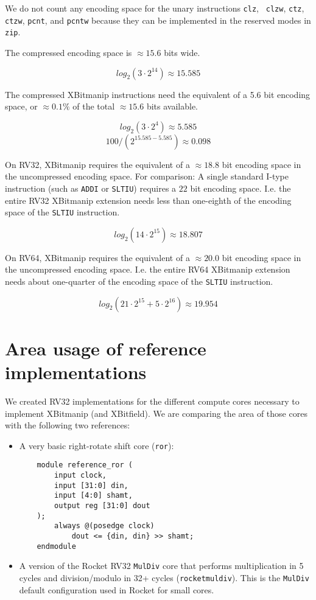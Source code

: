 We do not count any encoding space for the unary instructions {\tt clz}, {\tt
clzw}, {\tt ctz}, {\tt ctzw}, {\tt pcnt}, and {\tt pcntw} because they can
be implemented in the reserved modes in {\tt zip}.

The compressed encoding space is $\approx 15.6$ bits wide.

$$ log_2(3 \cdot 2^{14}) \approx 15.585 $$

The compressed XBitmanip instructions need the equivalent of a 5.6 bit
encoding space, or $\approx 0.1\%$ of the total $\approx 15.6$ bits available.

$$ log_2(3 \cdot 2^4) \approx 5.585 $$
$$ 100 / (2^{15.585-5.585}) \approx 0.098 $$

On RV32, XBitmanip requires the equivalent of a $\approx 18.8$ bit encoding space in
the uncompressed encoding space. For comparison: A single standard I-type
instruction (such as \texttt{ADDI} or \texttt{SLTIU}) requires a $22$ bit
encoding space. I.e. the entire RV32 XBitmanip extension needs less than
one-eighth of the encoding space of the \texttt{SLTIU} instruction.

$$ log_2(14\cdot2^{15}) \approx 18.807 $$

On RV64, XBitmanip requires the equivalent of a $\approx 20.0$ bit encoding
space in the uncompressed encoding space. I.e. the entire RV64 XBitmanip
extension needs about one-quarter of the encoding space of the \texttt{SLTIU}
instruction.

$$ log_2(21\cdot2^{15} + 5\cdot2^{16}) \approx 19.954 $$

\section{Area usage of reference implementations}

We created RV32 implementations for the different compute cores necessary to
implement XBitmanip (and XBitfield). We are comparing the area of those cores
with the following two references:

\begin{itemize}
\item A very basic right-rotate shift core ({\tt ror}):
\begin{verbatim}
    module reference_ror (
        input clock,
        input [31:0] din,
        input [4:0] shamt,
        output reg [31:0] dout
    );
        always @(posedge clock)
            dout <= {din, din} >> shamt;
    endmodule
\end{verbatim}
\item A version of the Rocket RV32 {\tt MulDiv} core that performs multiplication
in 5 cycles and division/modulo in 32+ cycles ({\tt rocketmuldiv}). This is the
{\tt MulDiv} default configuration used in Rocket for small cores.
\end{itemize}

